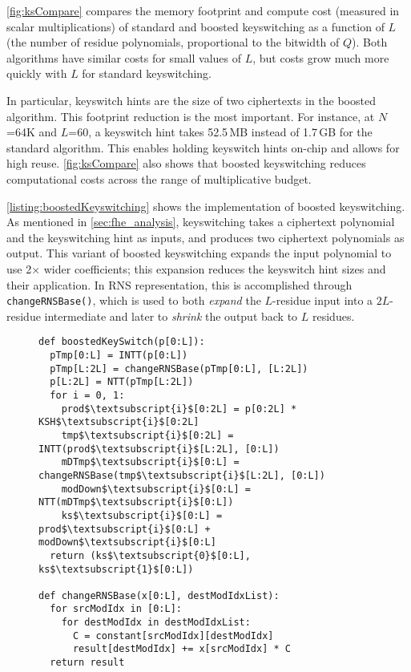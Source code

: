 \autoref{fig:ksCompare} compares the memory footprint and compute cost
(measured in scalar multiplications) of standard and boosted keyswitching as a
function of $L$ (the number of residue polynomials, proportional to the
bitwidth of $Q$). Both algorithms have similar costs for small values of $L$,
but costs grow much more quickly with $L$ for standard keyswitching.

In particular, keyswitch hints are the size of two ciphertexts in the boosted
algorithm. This footprint reduction is the most important. For instance, at
$N$=64K and $L$=60, a keyswitch hint takes 52.5\,MB instead of 1.7\,GB for the
standard algorithm. This enables holding keyswitch hints on-chip and allows for high
reuse. \autoref{fig:ksCompare} also shows that boosted keyswitching reduces
computational costs across the range of multiplicative budget.

\autoref{listing:boostedKeyswitching} shows the implementation of boosted
keyswitching. As mentioned in \autoref{sec:fhe_analysis}, keyswitching takes a
ciphertext polynomial and the keyswitching hint as inputs, and produces two
ciphertext polynomials as output. This variant of boosted keyswitching expands
the input polynomial to use 2$\times$ wider coefficients; this expansion
reduces the keyswitch hint sizes and their application. In RNS representation,
this is accomplished through \verb!changeRNSBase()!, which is used to both
\emph{expand} the $L$-residue input into a $2L$-residue intermediate and later
to \emph{shrink} the output back to $L$ residues.

    \begin{figure}\label{lst:boostedKeyswitching}
      \begin{center}
          \begin{lstlisting}[caption={Boosted keyswitching implementation.}, mathescape=true, style=custompython, label=listing:boostedKeyswitching]
def boostedKeySwitch(p[0:L]):
  pTmp[0:L] = INTT(p[0:L])
  pTmp[L:2L] = changeRNSBase(pTmp[0:L], [L:2L])
  p[L:2L] = NTT(pTmp[L:2L])
  for i = 0, 1:
    prod$\textsubscript{i}$[0:2L] = p[0:2L] * KSH$\textsubscript{i}$[0:2L]
    tmp$\textsubscript{i}$[0:2L] = INTT(prod$\textsubscript{i}$[L:2L], [0:L])
    mDTmp$\textsubscript{i}$[0:L] = changeRNSBase(tmp$\textsubscript{i}$[L:2L], [0:L])
    modDown$\textsubscript{i}$[0:L] = NTT(mDTmp$\textsubscript{i}$[0:L])
    ks$\textsubscript{i}$[0:L] = prod$\textsubscript{i}$[0:L] + modDown$\textsubscript{i}$[0:L]
  return (ks$\textsubscript{0}$[0:L], ks$\textsubscript{1}$[0:L])

def changeRNSBase(x[0:L], destModIdxList):
  for srcModIdx in [0:L]:
    for destModIdx in destModIdxList:
      C = constant[srcModIdx][destModIdx]
      result[destModIdx] += x[srcModIdx] * C
  return result
          \end{lstlisting}
        \end{center}
      \end{figure}

